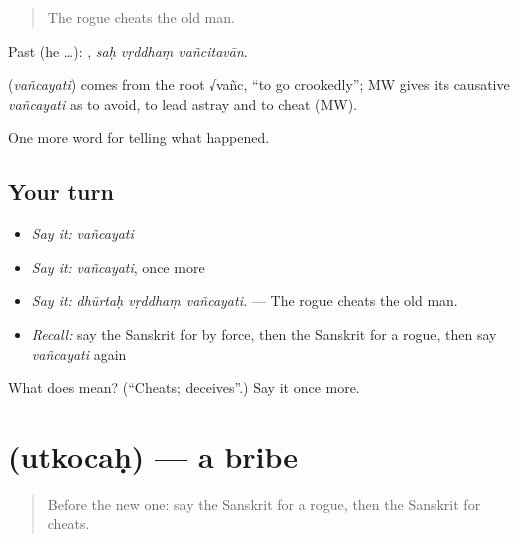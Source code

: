 \begin{quote}
The rogue cheats the old man.
\end{quote}

Past (he …):   , \emph{saḥ vṛddhaṃ vañcitavān}.

\begin{cousinweb}
\textbf{} (\emph{vañcayati}) comes from the root √vañc, \textquotedblleft{}to go crookedly\textquotedblright{}; MW gives its causative \emph{vañcayati} as to avoid, to lead astray and to cheat (MW).
\end{cousinweb}

\begin{grammarlens}[title={What you've built}]
One more word for telling what happened.
\end{grammarlens}

\subsection*{Your turn}
\begin{itemize}
\raggedright
  \item \emph{Say it:} \emph{vañcayati}
  \item \emph{Say it:} \emph{vañcayati}, once more
  \item \emph{Say it:} \emph{dhūrtaḥ vṛddhaṃ vañcayati.} — The rogue cheats the old man.
  \item \emph{Recall:} say the Sanskrit for by force, then the Sanskrit for a rogue, then say \emph{vañcayati} again
\end{itemize}

\begin{tcolorbox}[breakable,colback=teal!4,colframe=teal!35!black,title={Before you move on}]
What does  mean? (\textquotedblleft{}Cheats; deceives\textquotedblright{}.) Say it once more.
\end{tcolorbox}
\section[\texorpdfstring{\sk{उत्कोचः} (utkocaḥ)}{उत्कोचः (utkocaḥ)}]{ (utkocaḥ) — a bribe}

\label{lesson:SA-C291-utkocah}



\begin{quote}
Before the new one: say the Sanskrit for a rogue, then the Sanskrit for cheats.
\end{quote}

